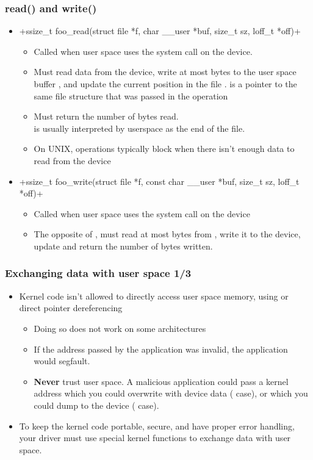 \begin{frame}[fragile]
  \frametitle{read() and write()}
  \begin{itemize}
  \item {}+ssize_t foo_read(struct file *f, char __user *buf, size_t sz, loff_t *off)+
    \begin{itemize}
    \item Called when user space uses the  system call on
      the device.
    \item Must read data from the device, write at most 
      bytes to the user space buffer , and update the
      current position in the file .  is a pointer
      to the same file structure that was passed in the 
      operation
    \item Must return the number of bytes read.\\
	   is usually interpreted by userspace as the end of
          the file.
    \item On UNIX,  operations typically block when there
      isn't enough data to read from the device
    \end{itemize}
  \item {}+ssize_t foo_write(struct file *f, const char __user *buf, size_t sz, loff_t *off)+
    \begin{itemize}
    \item Called when user space uses the  system call
      on the device
    \item The opposite of , must read at most 
      bytes from , write it to the device, update 
      and return the number of bytes written.
    \end{itemize}
  \end{itemize}
\end{frame}

\begin{frame}
  \frametitle{Exchanging data with user space 1/3}
  \begin{itemize}
  \item Kernel code isn't allowed to directly access user space
    memory, using  or direct pointer dereferencing
    \begin{itemize}
    \item Doing so does not work on some architectures
    \item If the address passed by the application was invalid, the
      application would segfault.
    \item {\bf Never} trust user space. A malicious application could
      pass a kernel address which you could overwrite with device data
      ( case), or which you could dump to the device
      ( case). 
    \end{itemize}
  \item To keep the kernel code portable, secure, and have proper
    error handling, your driver must use special kernel functions
    to exchange data with user space.
  \end{itemize}
\end{frame}

